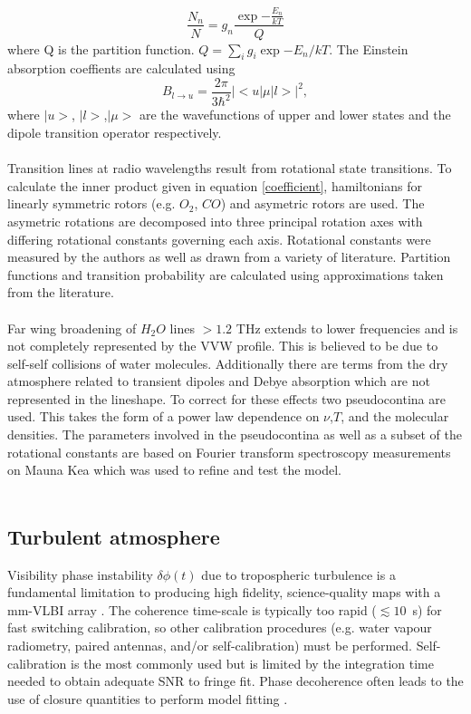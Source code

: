 \begin{equation}
\frac{N_n}{N} = g_n \frac {\exp{-\frac{E_n}{kT}}}{Q}
\end{equation}
where Q is the partition function. $Q = \sum_i g_i  \exp{-E_n/kT}$. The Einstein absorption coeffients are calculated using 
\begin{equation}\label{coefficient}
B_{l \to u} = \frac{2\pi}{3\hbar^2} |<u|\mu|l>|^2,
\end{equation}
where $|u>$, $|l>$,$|\mu>$ are the wavefunctions of upper and lower states and the dipole transition operator respectively. \\
~\\
Transition lines at radio wavelengths result from rotational state transitions.  To calculate the inner product given in equation \ref{coefficient}, hamiltonians for linearly  symmetric rotors (e.g. $O_2$, $CO$) and asymetric rotors are used. The asymetric rotations are decomposed into three principal rotation axes with differing rotational constants governing each axis. Rotational constants were measured by the authors as well as drawn from a variety of literature. Partition functions and transition probability are calculated using approximations taken from the literature.\\
~\\
Far wing broadening of $H_2O$ lines $> 1.2$ THz extends to lower frequencies and is not completely represented by the VVW profile. This is believed to be due to self-self collisions of water molecules. Additionally there are terms from the dry atmosphere related to transient dipoles and Debye absorption which are not represented in the lineshape. To correct for these effects two pseudocontina are used. This takes the form of a power law dependence on $\nu$,$T$, and the molecular densities. The parameters involved in the pseudocontina as well as a subset of the rotational constants are based on Fourier transform spectroscopy measurements on Mauna Kea which was used to refine and test the model.\\
 ~\\

\subsection{Turbulent atmosphere} 

Visibility phase instability  $\delta \phi(t)$ due to tropospheric turbulence is a fundamental limitation to producing high fidelity, science-quality maps with a mm-VLBI array \citep{Thompson_2001}. The coherence time-scale is typically too rapid ($\lesssim10$~s) for fast switching calibration, so other calibration procedures (e.g. water vapour radiometry, paired antennas, and/or self-calibration) must be performed. Self-calibration is the most commonly used but is limited by the integration time needed to obtain adequate SNR to fringe fit. Phase decoherence often leads to the use of closure quantities to perform model fitting \citep{Doeleman_2001,Bower_2004, Shen_2005}.


